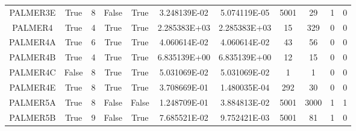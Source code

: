 \begin{longtable}{ccccccccccc}
	\cellcolor{default2} PALMER3E& \cellcolor{default2} True& \cellcolor{default2} 8& \cellcolor{default2} False& \cellcolor{default2} True& \cellcolor{poor} 3.248139E-02& \cellcolor{best} 5.074119E-05& \cellcolor{poor} 5001& \cellcolor{best} 29& \cellcolor{default2} 1& \cellcolor{default2} 0\\
	\cellcolor{default1} PALMER4& \cellcolor{default1} True& \cellcolor{default1} 4& \cellcolor{default1} True& \cellcolor{default1} True& \cellcolor{ok} 2.285383E+03& \cellcolor{best} 2.285383E+03& \cellcolor{best} 15& \cellcolor{poor} 329& \cellcolor{default1} 0& \cellcolor{default1} 0\\
	\cellcolor{default2} PALMER4A& \cellcolor{default2} True& \cellcolor{default2} 6& \cellcolor{default2} True& \cellcolor{default2} True& \cellcolor{ok} 4.060614E-02& \cellcolor{best} 4.060614E-02& \cellcolor{best} 43& \cellcolor{ok} 56& \cellcolor{default2} 0& \cellcolor{default2} 0\\
	\cellcolor{default1} PALMER4B& \cellcolor{default1} True& \cellcolor{default1} 4& \cellcolor{default1} True& \cellcolor{default1} True& \cellcolor{best} 6.835139E+00& \cellcolor{ok} 6.835139E+00& \cellcolor{best} 12& \cellcolor{ok} 15& \cellcolor{default1} 0& \cellcolor{default1} 0\\
	\cellcolor{default2} PALMER4C& \cellcolor{default2} False& \cellcolor{default2} 8& \cellcolor{default2} True& \cellcolor{default2} True& \cellcolor{best} 5.031069E-02& \cellcolor{ok} 5.031069E-02& \cellcolor{best} 1& \cellcolor{best} 1& \cellcolor{default2} 0& \cellcolor{default2} 0\\
	\cellcolor{default1} PALMER4E& \cellcolor{default1} True& \cellcolor{default1} 8& \cellcolor{default1} True& \cellcolor{default1} True& \cellcolor{poor} 3.708669E-01& \cellcolor{best} 1.480035E-04& \cellcolor{poor} 292& \cellcolor{best} 30& \cellcolor{default1} 0& \cellcolor{default1} 0\\
	\cellcolor{default2} PALMER5A& \cellcolor{default2} True& \cellcolor{default2} 8& \cellcolor{default2} False& \cellcolor{default2} False& \cellcolor{poor} 1.248709E-01& \cellcolor{best} 3.884813E-02& \cellcolor{ok} 5001& \cellcolor{best} 3000& \cellcolor{default2} 1& \cellcolor{default2} 1\\
	\cellcolor{default1} PALMER5B& \cellcolor{default1} True& \cellcolor{default1} 9& \cellcolor{default1} False& \cellcolor{default1} True& \cellcolor{poor} 7.685521E-02& \cellcolor{best} 9.752421E-03& \cellcolor{poor} 5001& \cellcolor{best} 81& \cellcolor{default1} 1& \cellcolor{default1} 0\\

\end{longtable}
